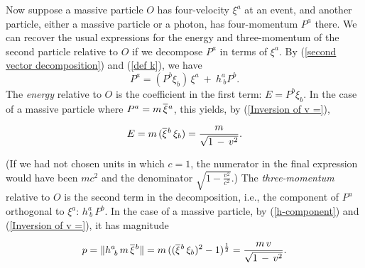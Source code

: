 \documentclass [12] {article}
\theoremstyle{plain}
\numberwithin{figure}{subsection}
\numberwithin{proposition}{subsection}
\begin{document}
Now suppose a massive particle $O$ has four-velocity $\xi^a$ at an event, and another particle, either a massive particle or a photon,  has four-momentum $P^a$ there. We can recover the usual expressions for the energy and three-momentum of the second particle relative to $O$ if we decompose $P^a$ in terms of $\xi^a$. By (\ref{second vector decomposition}) and (\ref{def k}),  we have 
\begin{equation}
\label{Pdecomposition}
P^a  =   (P^b \xi_b) \, \xi^a  \ +  \ h^a_{\ b} P^b.
\end{equation}
The \emph{energy} relative to $O$ is the coefficient in the first term:  $E =  P^b \xi_b$.  In the case of a massive particle where  $P^a = m \, \overline{\xi}\hspace{.05em}^a$, this yields, by  (\ref{Inversion of v =}),   

\begin{equation}
\label{relative energy}
E = m \, (\overline{\xi}\hspace{.05em}^b \, \xi_b)   =  \frac{m}{\sqrt{1 \,  - \, v^2}}.
\end{equation}  

\noindent (If we had not chosen units in which $c = 1$, the numerator in the final expression would have been $m c^2$ and the denominator $\sqrt{1   -  \frac{v^2}{c^2}}$.)  The \emph{three-momentum} relative to $O$ is the second term in the decomposition, i.e., the component of $P^a$ orthogonal to $\xi^a$:    $h^a_{\ b} \,  P^b$. In the case of a massive particle, by (\ref{h-component}) and  (\ref{Inversion of v =}),  it has magnitude

\begin{equation}
\label{relative momentum}
p  = \|h^a_{\ b} \,  m \, \overline{\xi}\hspace{.05em}^b\| =  m \, ((\overline{\xi}\hspace{.05em}^b \, \xi_b)^2 - 1)^{\frac{1}{2}} = \frac{m \, v}{\sqrt{1 \,  - \, v^2}}. 
\end{equation} 
\end{document}

